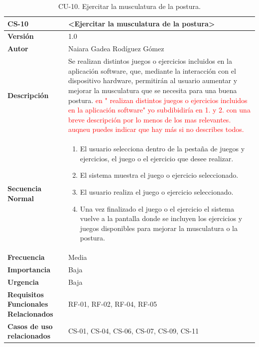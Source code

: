 \begin{table}[h!]
\centering
\begin{tabular}{ |m{3cm}|m{11cm}|  } 
\hline
\cellcolor[HTML]{B9E3F0}\textbf{CS-10} & \cellcolor[HTML]{B9E3F0}\textbf{<Ejercitar la musculatura de la postura>}\\

\hline
\cellcolor[HTML]{EFEFEF}\textbf{Versión}             & 1.0  \\
\hline
\cellcolor[HTML]{EFEFEF}\textbf{Autor}                & Naiara Gadea Rodíguez Gómez\\
\hline
\cellcolor[HTML]{EFEFEF}\textbf{Descripción}                & {Se realizan distintos juegos o ejercicios incluidos en la aplicación software, que, mediante la interacción con el dispositivo hardware, permitirán al usuario aumentar y mejorar la musculatura que se necesita para una buena postura. \textcolor{red}{en " realizan distintos juegos o ejercicios incluidos en la aplicación
software" yo subdibidiría en 1. y 2. con una breve descripción por lo menos de los mas relevantes. auqneu puedes indicar que hay más si no describes todos.}}\\
\hline
\cellcolor[HTML]{EFEFEF}\textbf{Secuencia \newline Normal}                &                 
        \begin{enumerate}
			\def\labelenumi{\arabic{enumi}.}
			\tightlist
			\item El usuario selecciona dentro de la pestaña de juegos y ejercicios, el juego o el ejercicio que desee realizar. 
			\item El sistema muestra el juego o ejercicio seleccionado. 
                \item El usuario realiza el juego o ejercicio seleccionado. 
                \item Una vez finalizado el juego o el ejercicio el sistema vuelve a la pantalla donde se incluyen los ejercicios y juegos disponibles para mejorar la musculatura o la postura. 
		\end{enumerate}\\
\hline
\cellcolor[HTML]{EFEFEF}\textbf{Frecuencia}                & Media\\
\hline
\cellcolor[HTML]{EFEFEF}\textbf{Importancia}                & Baja\\
\hline
\cellcolor[HTML]{EFEFEF}\textbf{Urgencia}                & Baja\\
\hline
\cellcolor[HTML]{EFEFEF}\textbf{Requisitos Funcionales Relacionados}                & {RF-01, RF-02, RF-04, RF-05 }\\
\hline
\cellcolor[HTML]{EFEFEF}\textbf{Casos de uso relacionados}                & {CS-01, CS-04, CS-06, CS-07, CS-09, CS-11}\\
\hline
\end{tabular}
\caption{CU-10. Ejercitar la musculatura de la postura.}
\end{table}


